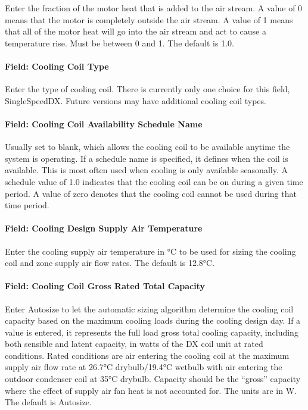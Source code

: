 Enter the fraction of the motor heat that is added to the air stream. A value of 0 means that the motor is completely outside the air stream. A value of 1 means that all of the motor heat will go into the air stream and act to cause a temperature rise. Must be between 0 and 1. The default is 1.0.

\paragraph{Field: Cooling Coil Type}\label{field-cooling-coil-type-6}

Enter the type of cooling coil. There is currently only one choice for this field, SingleSpeedDX. Future versions may have additional cooling coil types.

\paragraph{Field: Cooling Coil Availability Schedule Name}\label{field-cooling-coil-availability-schedule-name-5}

Usually set to blank, which allows the cooling coil to be available anytime the system is operating. If a schedule name is specified, it defines when the coil is available. This is most often used when cooling is only available seasonally. A schedule value of 1.0 indicates that the cooling coil can be on during a given time period. A value of zero denotes that the cooling coil cannot be used during that time period.

\paragraph{Field: Cooling Design Supply Air Temperature}\label{field-cooling-design-supply-air-temperature-1}

Enter the cooling supply air temperature in °C to be used for sizing the cooling coil and zone supply air flow rates. The default is 12.8°C.

\paragraph{Field: Cooling Coil Gross Rated Total Capacity}\label{field-cooling-coil-gross-rated-total-capacity-5}

Enter Autosize to let the automatic sizing algorithm determine the cooling coil capacity based on the maximum cooling loads during the cooling design day. If a value is entered, it represents the full load gross total cooling capacity, including both sensible and latent capacity, in watts of the DX coil unit at rated conditions. Rated conditions are air entering the cooling coil at the maximum supply air flow rate at 26.7°C drybulb/19.4°C wetbulb with air entering the outdoor condenser coil at 35°C drybulb. Capacity should be the ``gross'' capacity where the effect of supply air fan heat is not accounted for. The units are in W. The default is Autosize.

